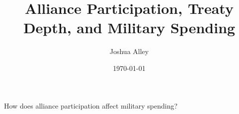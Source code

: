 \documentclass[12pt]{beamer}
\title{Alliance Participation, Treaty Depth, and Military Spending}
\date{\today}
\author{Joshua Alley}
\institute{Texas A\&M University}
\begin{document}
 \maketitle



 \begin{frame}[standout]

How does alliance participation affect military spending?  

 \end{frame}

\end{document}
